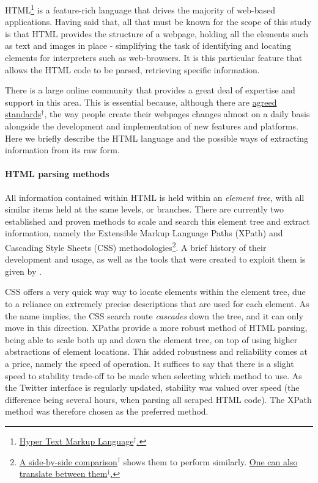 \documentclass{article}
\begin{document}
HTML\footnote{\href{https://en.wikipedia.org/wiki/HTML}{Hyper Text Markup Language$^{\dag{}}$.}} is a feature-rich language that drives the majority of web-based applications. Having said that, all that must be known for the scope of this study is that HTML provides the structure of a webpage, holding all the elements such as text and images in place - simplifying the task of identifying and locating elements for interpreters such as web-browsers. It is this particular feature that allows the HTML code to be parsed, retrieving specific information.

There is a large online community that provides a great deal of expertise and support in this area. This is essential because, although there are \href{http://www.w3.org/TR/html51/}{agreed standards$^{\dag{}}$}, the way people create their webpages changes almost on a daily basis alongside the development and implementation of new features and platforms. Here we briefly describe the HTML language and the possible ways of extracting information from its raw form.


\paragraph{HTML parsing methods}
\label{sec-1-3-4-1}

All information contained within HTML is held within an \emph{element tree}, with all similar items held at the same levels, or branches. There are currently two established and proven methods to scale and search this element tree and extract information, namely the Extensible Markup Language Paths (XPath) and Cascading Style Sheets (CSS) methodologies\footnote{\href{http://elementalselenium.com/tips/32-xpath-vs-css}{A side-by-side comparison$^{\dag{}}$} shows them to perform similarly. \href{http://saucelabs.com/resources/selenium/css-selectors}{One can also translate between them$^{\dag{}}$.}}. A brief history of their development and usage, as well as the tools that were created to exploit them is given by \cite{krijnen:automated}.

CSS offers a very quick way way to locate elements within the element tree, due to a reliance on extremely precise descriptions that are used for each element. As the name implies, the CSS search route \emph{cascades} down the tree, and it can only move in this direction. XPaths provide a more robust method of HTML parsing, being able to scale both up and down the element tree, on top of using higher abstractions of element locations. This added robustness and reliability comes at a price, namely the speed of operation. It suffices to say that there is a slight speed to stability trade-off to be made when selecting which method to use. As the Twitter interface is regularly updated, stability was valued over speed (the difference being several hours, when parsing all scraped HTML code). The XPath method was therefore chosen as the preferred method.
\end{document}
